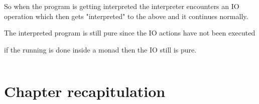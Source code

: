 \documentclass[thesis-solanki.tex]{subfiles}
\begin{document}
So when the program is getting interpreted the interpreter encounters an IO operation which then gets "interpreted" to the above and it 
continues normally.

The interpreted program is still pure since the IO actions have not been executed 

if the running is done inside a monad then the IO still is pure.


\begin{singlespace}
  \inputminted[linenos]{haskell}{haskell-proto4-platen-winkel.hs}
\end{singlespace}


\section{Chapter recapitulation}

\ifMain
\begin{scope}
  \nolinenumbers
  \enotesize
  \par
  \begin{singlespace}
  \setlength{\parskip}{12pt plus 2pt minus 1pt}
  \theendnotes
  \par
  \end{singlespace}
\end{scope}
\fi
\end{document}
